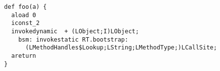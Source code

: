 {\scriptsize \begin{verbatim}
  def foo(a) {
    aload 0
    iconst_2 
    invokedynamic  + (LObject;I)LObject;
      bsm: invokestatic RT.bootstrap:
        (LMethodHandles$Lookup;LString;LMethodType;)LCallSite;
    areturn 
  }
\end{verbatim} }
